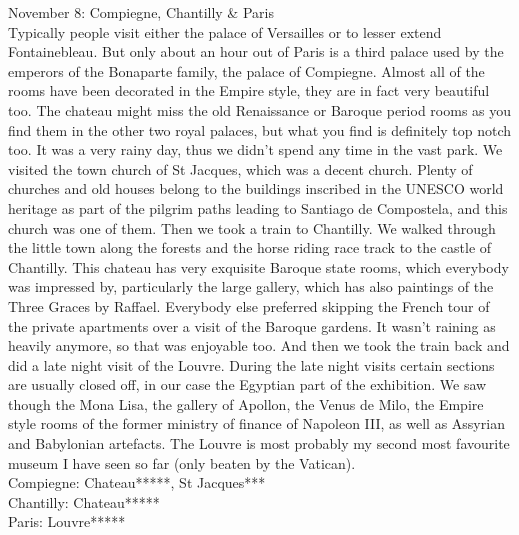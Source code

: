 November 8: Compiegne, Chantilly \& Paris\\
Typically people visit either the palace of Versailles or to lesser extend Fontainebleau. But only about an hour out of Paris is a third palace used by the emperors of the Bonaparte family, the palace of Compiegne. Almost all of the rooms have been decorated in the Empire style, they are in fact very beautiful too. The chateau might miss the old Renaissance or Baroque period rooms as you find them in the other two royal palaces, but what you find is definitely top notch too. It was a very rainy day, thus we didn't spend any time in the vast park. We visited the town church of St Jacques, which was a decent church. Plenty of churches and old houses belong to the buildings inscribed in the UNESCO world heritage as part of the pilgrim paths leading to Santiago de Compostela, and this church was one of them. Then we took a train to Chantilly. We walked through the little town along the forests and the horse riding race track to the castle of Chantilly. This chateau has very exquisite Baroque state rooms, which everybody was impressed by, particularly the large gallery, which has also paintings of the Three Graces by Raffael. Everybody else preferred skipping the French tour of the private apartments over a visit of the Baroque gardens. It wasn't raining as heavily anymore, so that was enjoyable too. And then we took the train back and did a late night visit of the Louvre. During the late night visits certain sections are usually closed off, in our case the Egyptian part of the exhibition. We saw though the Mona Lisa, the gallery of Apollon, the Venus de Milo, the Empire style rooms of the former ministry of finance of Napoleon III, as well as Assyrian and Babylonian artefacts. The Louvre is most probably my second most favourite museum I have seen so far (only beaten by the Vatican). \\

Compiegne: Chateau*****, St Jacques***\\
Chantilly: Chateau*****\\
Paris: Louvre*****\\


